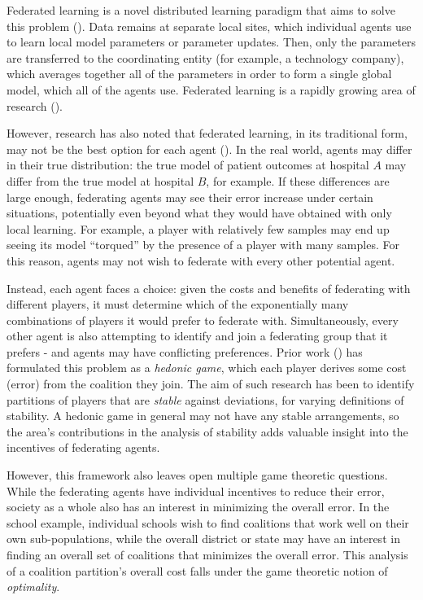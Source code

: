 \documentclass{article}
\begin{document}
Federated learning is a novel distributed learning paradigm that aims to solve this problem (\cite{mcmahan2016communicationefficient}). Data remains at separate local sites, which individual agents use to learn local model parameters or parameter updates. Then, only the parameters are transferred to the coordinating entity (for example, a technology company), which averages together all of the parameters in order to form a single global model, which all of the agents use. Federated learning is a rapidly growing area of research (\cite{Li_2020, kairouz2019advances, fedsurvey}). 

However, research has also noted that federated learning, in its traditional form, may not be the best option for each agent (\cite{yu2020salvaging, bagdasaryan2019differential, li2019fair, mohri2019agnostic}). In the real world, agents may differ in their true distribution: the true model of patient outcomes at hospital $A$ may differ from the true model at hospital $B$, for example. If these differences are large enough, federating agents may see their error increase under certain situations, potentially even beyond what they would have obtained with only local learning. For example, a player with relatively few samples may end up seeing its model \enquote{torqued} by the presence of a player with many samples. For this reason, agents may not wish to federate with every other potential agent. 

Instead, each agent faces a choice: given the costs and benefits of federating with different players, it must determine which of the exponentially many combinations of players it would prefer to federate with. Simultaneously, every other agent is also attempting to identify and join a federating group that it prefers - and agents may have conflicting preferences. Prior work (\cite{donahue2020model, hasan2021incentive}) has formulated this problem as a \emph{hedonic game}, which each player derives some cost (error) from the coalition they join. The aim of such research has been to identify partitions of players that are \emph{stable} against deviations, for varying definitions of stability. A hedonic game in general may not have any stable arrangements, so the area's contributions in the analysis of stability adds valuable insight into the incentives of federating agents.

However, this framework also leaves open multiple game theoretic questions. While the federating agents have individual incentives to reduce their error, society as a whole also has an interest in minimizing the overall error. In the school example, individual schools wish to find coalitions that work well on their own sub-populations, while the overall district or state may have an interest in finding an overall set of coalitions that minimizes the overall error. This analysis of a coalition partition's overall cost falls under the game theoretic notion of \emph{optimality}.
\end{document}
